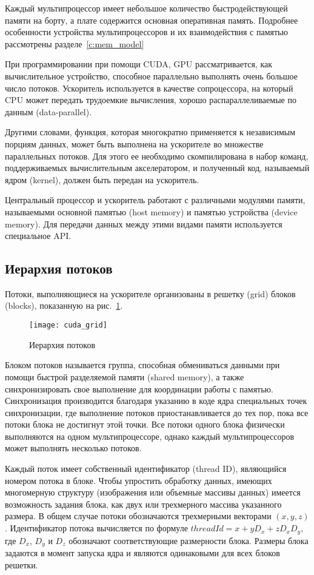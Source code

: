 Каждый мультипроцессор имеет небольшое количество быстродействующей памяти на борту, а плате содержится основная оперативная память. Подробнее особенности устройства мультипроцессоров и их взаимодействия с памятью рассмотрены разделе~\ref{c:mem_model}

При программировании при помощи CUDA, GPU рассматривается, как вычислительное устройство, способное параллельно выполнять очень большое число потоков. Ускоритель используется в качестве сопроцессора, на который CPU может передать трудоемкие вычисления, хорошо распараллеливаемые по данным (data-parallel).

Другими словами, функция, которая многократно применяется к независимым порциям данных, может быть выполнена на ускорителе во множестве параллельных потоков. Для этого ее необходимо скомпилирована в набор команд, поддерживаемых вычислительным акселератором, и полученный код, называемый ядром (kernel), должен быть передан на ускоритель.

Центральный процессор и ускоритель работают с различными модулями памяти, называемыми основной памятью (host memory) и памятью устройства (device memory). Для передачи данных между этими видами памяти используется специальное API.

\subsection{Иерархия потоков}
Потоки, выполняющиеся на ускорителе организованы в решетку (grid) блоков (blocks), показанную на рис.~\ref{fig:cuda_grid}.

\begin{figure}[ht]
\center
\texttt{[image: cuda\_grid]}
\caption{Иерархия потоков}
\label{fig:cuda_grid}
\end{figure}

Блоком потоков называется группа, способная обмениваться данными при помощи быстрой разделяемой памяти (shared memory), а также синхронизировать свое выполнение для координации работы с памятью. Синхронизация производится благодаря указанию в коде ядра специальных точек синхронизации, где выполнение потоков приостанавливается до тех пор, пока все потоки блока не достигнут этой точки. Все потоки одного блока физически выполняются на одном мультипроцессоре, однако каждый мультипроцессоров может выполнять несколько потоков.

Каждый поток имеет собственный идентификатор (thread ID), являющийся номером потока в блоке. Чтобы упростить обработку данных, имеющих многомерную структуру (изображения или объемные массивы данных) имеется возможность задания блока, как двух или трехмерного массива указанного размера. В общем случае потоки обозначаются трехмерными векторами $(x, y, z)$. Идентификатор потока вычисляется по формуле $threadId = x + yD_x + zD_xD_y$, где $D_x$, $D_y$ и $D_z$ обозначают соответствующие размерности блока. Размеры блока задаются в момент запуска ядра и являются одинаковыми для всех блоков решетки.
 
